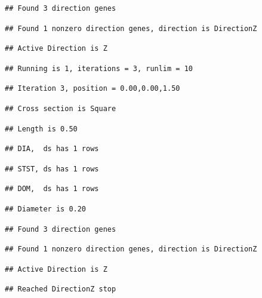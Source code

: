 \documentclass[]{article}
\begin{document}
\begin{verbatim}
## Found 3 direction genes
\end{verbatim}

\begin{verbatim}
## Found 1 nonzero direction genes, direction is DirectionZ
\end{verbatim}

\begin{verbatim}
## Active Direction is Z
\end{verbatim}

\begin{verbatim}
## Running is 1, iterations = 3, runlim = 10
\end{verbatim}

\begin{verbatim}
## Iteration 3, position = 0.00,0.00,1.50
\end{verbatim}

\begin{verbatim}
## Cross section is Square
\end{verbatim}

\begin{verbatim}
## Length is 0.50
\end{verbatim}

\begin{verbatim}
## DIA,  ds has 1 rows
\end{verbatim}

\begin{verbatim}
## STST, ds has 1 rows
\end{verbatim}

\begin{verbatim}
## DOM,  ds has 1 rows
\end{verbatim}

\begin{verbatim}
## Diameter is 0.20
\end{verbatim}

\begin{verbatim}
## Found 3 direction genes
\end{verbatim}

\begin{verbatim}
## Found 1 nonzero direction genes, direction is DirectionZ
\end{verbatim}

\begin{verbatim}
## Active Direction is Z
\end{verbatim}

\begin{verbatim}
## Reached DirectionZ stop
\end{verbatim}
\end{document}
